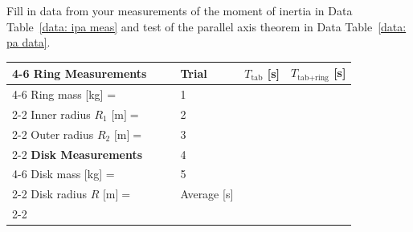 \documentclass[addpoints]{physlabs}
\begin{document}
\begin{postlab}



    \filbreak
    \question[3] Fill in data from your measurements of the moment of inertia in Data Table~\ref{data: ipa meas} and test of the parallel axis theorem in Data Table~\ref{data: pa data}.

    \begin{center}
        \renewcommand{\arraystretch}{2}
        \captionsetup{font=normalsize}
        \begin{tabular}{lp{3cm}p{1cm}|p{2cm}|p{2cm}|p{2cm}|}
        \cline{4-6}
        {\bf Ring Measurements}              & & & Trial       & $T_\text{tab}$ [s] & $T_{\text{tab}+\text{ring}}$ [s]
        \\
        \cline{4-6}
        Ring mass [kg] =               & & & 1           &                    &                                  \\
        \cline{2-2}\cline{4-6}
        Inner radius $R_1\text{ [m]}=$ & & & 2           &                    &                                  \\
        \cline{2-2}\cline{4-6}
        Outer radius $R_2\text{ [m]}=$ & & & 3           &                    &                                  \\
        \cline{2-2}\cline{4-6}
        {\bf Disk Measurements}              & & & 4           &                    &                                  \\
        \cline{4-6}
        Disk mass [kg] =               & & & 5           &                    &                                  \\
        \cline{2-2}\cline{4-6}
        Disk radius $R\text{ [m]}=$    & & & Average [s] &                    &                                 \\
        \cline{2-2}\cline{4-6}
        \end{tabular}
    \end{center}
    

\end{postlab}
\end{document}

